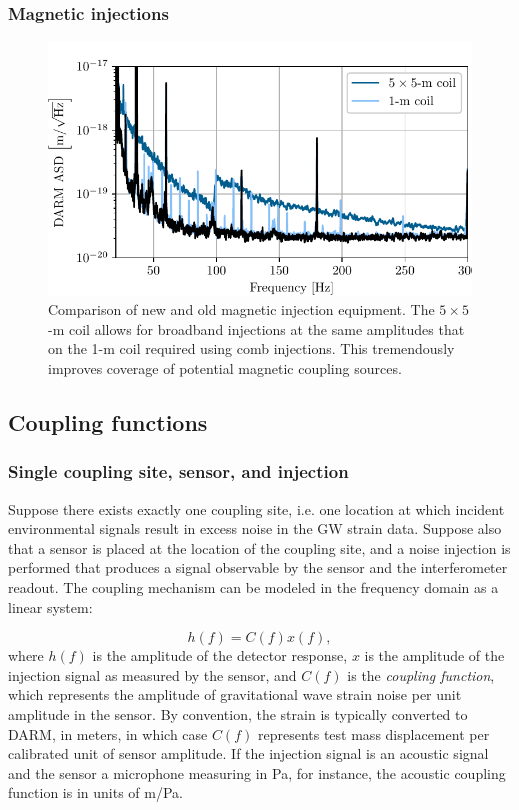 \subsubsection{Magnetic injections}

\begin{figure}[h]
	\centering
	\includegraphics{figures/wallcoil.pdf}
	\caption{
		Comparison of new and old magnetic injection equipment.
		The $5\times5$\hyp m coil allows for broadband injections at the same amplitudes that on the 1\hyp m coil required using comb injections. This tremendously improves coverage of potential magnetic coupling sources.}
	\label{fig:wallcoil}
\end{figure}

\subsection{Coupling functions}

\subsubsection{Single coupling site, sensor, and injection}

Suppose there exists exactly one coupling site, i.e. one location at which incident environmental signals result in excess noise in the \ac{GW} strain data.
Suppose also that a sensor is placed at the location of the coupling site, and a noise injection is performed that produces a signal observable by the sensor and the interferometer readout.
The coupling mechanism can be modeled in the frequency domain as a linear system:

\begin{equation}\label{eq:cf_model}
	h(f) = C(f) x(f),
\end{equation}
where $h(f)$ is the amplitude of the detector response, $x$ is the amplitude of the injection signal as measured by the sensor, and $C(f)$ is the \textit{coupling function}, which represents the amplitude of gravitational wave strain noise per unit amplitude in the sensor.
By convention, the strain is typically converted to \ac{DARM}, in meters, in which case $C(f)$ represents  test mass displacement per calibrated unit of sensor amplitude.
If the injection signal is an acoustic signal and the sensor a microphone measuring in Pa, for instance, the acoustic coupling function is in units of m/Pa.


